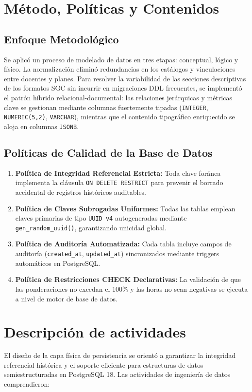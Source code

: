 \documentclass[12pt,a4paper]{article}
\begin{document}
\section{Método, Políticas y Contenidos}
\subsection{Enfoque Metodológico}
Se aplicó un proceso de modelado de datos en tres etapas: conceptual, lógico y físico. La normalización eliminó redundancias en los catálogos y vinculaciones entre docentes y planes. Para resolver la variabilidad de las secciones descriptivas de los formatos SGC sin incurrir en migraciones DDL frecuentes, se implementó el patrón híbrido relacional-documental: las relaciones jerárquicas y métricas clave se gestionan mediante columnas fuertemente tipadas (\texttt{INTEGER}, \texttt{NUMERIC(5,2)}, \texttt{VARCHAR}), mientras que el contenido tipográfico enriquecido se aloja en columnas \texttt{JSONB}.

\subsection{Políticas de Calidad de la Base de Datos}
\begin{enumerate}[leftmargin=1.5em, itemsep=2pt]
    \item \textbf{Política de Integridad Referencial Estricta:} Toda clave foránea implementa la cláusula \texttt{ON DELETE RESTRICT} para prevenir el borrado accidental de registros históricos auditables.
    \item \textbf{Política de Claves Subrogadas Uniformes:} Todas las tablas emplean claves primarias de tipo \texttt{UUID v4} autogeneradas mediante \texttt{gen\_\allowbreak  random\_\allowbreak  uuid()}, garantizando unicidad global.
    \item \textbf{Política de Auditoría Automatizada:} Cada tabla incluye campos de auditoría (\texttt{created\_\allowbreak  at}, \texttt{updated\_\allowbreak  at}) sincronizados mediante triggers automáticos en PostgreSQL.
    \item \textbf{Política de Restricciones CHECK Declarativas:} La validación de que las ponderaciones no excedan el 100\% y las horas no sean negativas se ejecuta a nivel de motor de base de datos.
\end{enumerate}

\section{Descripción de actividades}
El diseño de la capa física de persistencia se orientó a garantizar la integridad referencial histórica y el soporte eficiente para estructuras de datos semiestructuradas en PostgreSQL 18. Las actividades de ingeniería de datos comprendieron:
\end{document}
